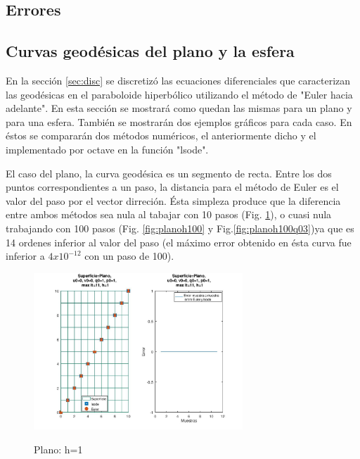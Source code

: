\documentclass{endm}
\begin{document}
\subsection*{Errores}\label{subsec:errores}

\subsection*{Curvas geod\'esicas del plano y la esfera}
En la secci\'on \ref{sec:disc} se discretiz\'o las ecuaciones diferenciales que caracterizan las geod\'esicas en el paraboloide hiperb\'olico utilizando el m\'etodo de "Euler hacia adelante". En esta secci\'on se mostrar\'a como quedan las mismas para un plano y para una esfera. Tambi\'en se mostrar\'an dos ejemplos gr\'aficos para cada caso. En \'estos se comparar\'an dos m\'etodos num\'ericos, el anteriormente dicho y el implementado por octave en la funci\'on "lsode".

El caso del plano, la curva geod\'esica es un segmento de recta. Entre los dos puntos correspondientes a un paso, la distancia para el método de Euler es el valor del paso por el vector dirreci\'on. \'Esta simpleza produce que la diferencia entre ambos m\'etodos sea nula al tabajar con 10 pasos (Fig. \ref{fig:plano}), o cuasi nula trabajando con 100 pasos (Fig. \ref{fig:planoh100} y Fig.\ref{fig:planoh100q03})ya que es 14 ordenes inferior al valor del paso (el m\'aximo error obtenido en \'esta curva fue inferior a $4x10^{-12}$ con un paso de 100).

\begin{figure}[H]
\caption{Plano: h=1}
\centering
\includegraphics[width=0.7\textwidth]{plano.jpg}
\label{fig:plano}
\end{figure}
\end{document}
